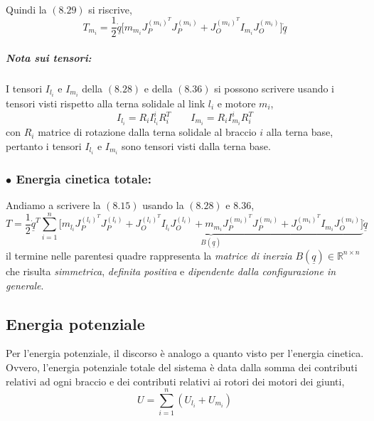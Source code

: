 \paragraph{}
Quindi la $(8.29)$ si riscrive,
\begin{equation}
	T_{m_i} = \frac{1}{2} \underline{\dot{q}} \Biggl[ m_{m_i} J_P^{(m_i)^T} J_P^{(m_i)} + J_O^{(m_i)^T} I_{m_i} J_O^{(m_i)} \Biggr]\underline{\dot{q}}
\end{equation}

\subparagraph{Nota sui tensori:}
I tensori $I_{l_i}$ e $I_{m_i}$ della $(8.28)$ e della $(8.36)$ si possono scrivere usando i tensori visti rispetto alla terna solidale al link $l_i$ e motore $m_i$,
\begin{equation}
	I_{l_i} = R_i I_{l_i}^i R_i^T \qquad I_{m_i} = R_i I_{m_i}^i R_i^T
\end{equation}
con $R_i$ matrice di rotazione dalla terna solidale al braccio $i$ alla terna base, pertanto i tensori $I_{l_i}$ e $I_{m_i}$ sono tensori visti dalla terna base.

\subsubsection{$\bullet$ Energia cinetica totale:}
Andiamo a scrivere la $(8.15)$ usando la $(8.28)$ e $8.36$,
\begin{equation}
	T = \frac{1}{2} \underline{\dot{q}}^T \sum_{i = 1}^n \underbrace{\Biggl[ m_{l_i} J_P^{(l_i)^T} J_P^{(l_i)} + J_O^{(l_i)^T} I_{l_i} J_O^{(l_i)} + m_{m_i} J_P^{(m_i)^T} J_P^{(m_i)} + J_O^{(m_i)^T} I_{m_i} J_O^{(m_i)} \Biggr]}_{B(\underline{q})} \underline{\dot{q}}
\end{equation}
il termine nelle parentesi quadre rappresenta la \emph{matrice di inerzia} $B(\underline{q}) \in \mathbb{R}^{n \times n}$ che risulta \emph{simmetrica}, \emph{definita positiva} e \emph{dipendente dalla configurazione in generale}.

\subsection{Energia potenziale}
Per l'energia potenziale, il discorso è analogo a quanto visto per l'energia cinetica. Ovvero, l'energia potenziale totale del sistema è data dalla somma dei contributi relativi ad ogni braccio e dei contributi relativi ai rotori dei motori dei giunti,
\begin{equation}
	U = \sum_{i=1}^n (U_{l_i} + U_{m_i})
\end{equation}

